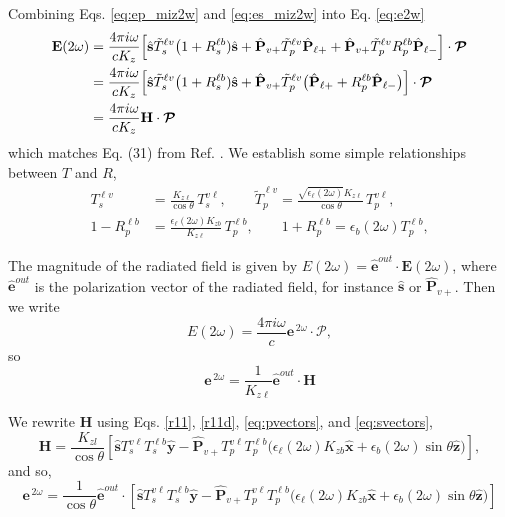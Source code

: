 \documentclass{article}
\begin{document}
Combining Eqs. \eqref{eq:ep_miz2w} and \eqref{eq:es_miz2w} into Eq. \eqref{eq:e2w}
\begin{align}
\mathbf{E}(2\omega) &= \frac{4\pi i\omega}{c K_{z}}\Bigl[\hat{\mathbf{s}}\tilde{T}_{s}^{\ell v}\bigl(1 + R_{s}^{\ell b})\hat{\mathbf{s}} + \hat{\mathbf{P}}_{v+}\tilde{T}_{p}^{\ell v}\hat{\mathbf{P}}_{\ell +} + \hat{\mathbf{P}}_{v+}\tilde{T}_{p}^{\ell v}R_{p}^{\ell b}\hat{\mathbf{P}}_{\ell -}\Bigr]\cdot\boldsymbol{\mathcal{P}}\\
&= \frac{4\pi i\omega}{c K_{z}}\Bigl[\hat{\mathbf{s}}\tilde{T}_{s}^{\ell v}\bigl(1 + R_{s}^{\ell b})\hat{\mathbf{s}} + \hat{\mathbf{P}}_{v+}\tilde{T}_{p}^{\ell v}\bigl(\hat{\mathbf{P}}_{\ell +} + R_{p}^{\ell b}\hat{\mathbf{P}}_{\ell -}\bigr)\Bigr]\cdot\boldsymbol{\mathcal{P}}\\
&= \frac{4\pi i\omega}{c K_{z}}\mathbf{H}\cdot\boldsymbol{\mathcal{P}}
\end{align}
which matches Eq. (31) from Ref. \cite{mendozaEPI04}. We establish some simple relationships between $T$ and $R$,
\begin{align}\label{r11}
T_{s}^{\ell v} &= \frac{K_{z\ell}}{\cos\theta}\,T_{s}^{v\ell},  \quad\quad
\tilde{T}_p^{\ell v} = \frac{\sqrt{\epsilon_{\ell}(2\omega)}K_{z\ell}}{\cos\theta}\,T^{v\ell}_{p},\\
1 - R^{\ell b}_{p} &= \frac{\epsilon_{\ell}(2\omega)K_{zb}}{K_{z\ell}}\,T_{p}^{\ell b}, \quad\quad 
1 + R_{p}^{\ell b} = \epsilon_{b}(2\omega)T_{p}^{\ell b},\label{r11d}
\end{align}

The magnitude of the radiated field is given by
$E(2\omega)=\hat{\mathbf{e}}^{out}\cdot\mathbf{E}(2\omega)$,
where $\hat{\mathbf{e}}^{out}$ is the polarization vector of the radiated field, for
instance $\hat{\mathbf{s}}$ or $\hat{\mathbf{P}}_{v+}$. Then we write
\begin{equation}\label{r10}
E(2\omega)=\frac{4\pi i\omega}{c}\mathbf{e}^{\,2\omega}\cdot\boldsymbol{\mathcal{P}},
\end{equation}
so
\begin{equation}
\mathbf{e}^{\,2\omega} = \frac{1}{K_{z\ell}}\hat{\mathbf{e}}^{out}\cdot\mathbf{H}
\end{equation}

We rewrite $\mathbf{H}$ using Eqs. \eqref{r11}, \eqref{r11d}, \eqref{eq:pvectors}, and \eqref{eq:svectors},
\begin{equation}
\mathbf{H} = \frac{K_{zl}}{\cos\theta}\left[\hat{\mathbf{s}}T_{s}^{v\ell}T_{s}^{\ell b}\hat{\mathbf{y}} - \hat{\mathbf{P}}_{v+}T_{p}^{v\ell}T_{p}^{\ell b}\bigl(\epsilon_{\ell}(2\omega)K_{zb}\hat{\mathbf{x}} + \epsilon_{b}(2\omega)\sin\theta\hat{\mathbf{z}}\bigr)\right],
\end{equation}
and so,
\begin{equation}
\mathbf{e}^{\,2\omega} = \frac{1}{\cos\theta}\hat{\mathbf{e}}^{out}\cdot\left[\hat{\mathbf{s}}T_{s}^{v\ell}T_{s}^{\ell b}\hat{\mathbf{y}} - \hat{\mathbf{P}}_{v+}T_{p}^{v\ell}T_{p}^{\ell b}\bigl(\epsilon_{\ell}(2\omega)K_{zb}\hat{\mathbf{x}} + \epsilon_{b}(2\omega)\sin\theta\hat{\mathbf{z}}\bigr)\right]
\end{equation}
\end{document}

